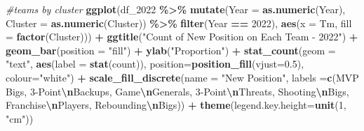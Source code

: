 \documentclass[
]{article}
\newenvironment{Shaded}{\begin{snugshade}}{\end{snugshade}}
\newcommand{\AttributeTok}[1]{\textcolor[rgb]{0.13,0.29,0.53}{#1}}
\newcommand{\CommentTok}[1]{\textcolor[rgb]{0.56,0.35,0.01}{\textit{#1}}}
\newcommand{\DecValTok}[1]{\textcolor[rgb]{0.00,0.00,0.81}{#1}}
\newcommand{\FloatTok}[1]{\textcolor[rgb]{0.00,0.00,0.81}{#1}}
\newcommand{\FunctionTok}[1]{\textcolor[rgb]{0.13,0.29,0.53}{\textbf{#1}}}
\newcommand{\NormalTok}[1]{#1}
\newcommand{\SpecialCharTok}[1]{\textcolor[rgb]{0.81,0.36,0.00}{\textbf{#1}}}
\newcommand{\StringTok}[1]{\textcolor[rgb]{0.31,0.60,0.02}{#1}}
\begin{document}
\begin{Shaded}
\begin{Highlighting}[]
\CommentTok{\#teams by cluster}
\FunctionTok{ggplot}\NormalTok{(df\_2022 }\SpecialCharTok{\%\textgreater{}\%} 
         \FunctionTok{mutate}\NormalTok{(}\AttributeTok{Year =} \FunctionTok{as.numeric}\NormalTok{(Year),}
                \AttributeTok{Cluster =} \FunctionTok{as.numeric}\NormalTok{(Cluster)) }\SpecialCharTok{\%\textgreater{}\%}
         \FunctionTok{filter}\NormalTok{(Year }\SpecialCharTok{==} \DecValTok{2022}\NormalTok{),}
       \FunctionTok{aes}\NormalTok{(}\AttributeTok{x =}\NormalTok{ Tm, }\AttributeTok{fill =} \FunctionTok{factor}\NormalTok{(Cluster))) }\SpecialCharTok{+}
  \FunctionTok{ggtitle}\NormalTok{(}\StringTok{"Count of New Position on Each Team {-} 2022"}\NormalTok{) }\SpecialCharTok{+}
  \FunctionTok{geom\_bar}\NormalTok{(}\AttributeTok{position =} \StringTok{"fill"}\NormalTok{) }\SpecialCharTok{+} \FunctionTok{ylab}\NormalTok{(}\StringTok{"Proportion"}\NormalTok{) }\SpecialCharTok{+}
  \FunctionTok{stat\_count}\NormalTok{(}\AttributeTok{geom =} \StringTok{"text"}\NormalTok{, }
             \FunctionTok{aes}\NormalTok{(}\AttributeTok{label =} \FunctionTok{stat}\NormalTok{(count)),}
             \AttributeTok{position=}\FunctionTok{position\_fill}\NormalTok{(}\AttributeTok{vjust=}\FloatTok{0.5}\NormalTok{), }\AttributeTok{colour=}\StringTok{"white"}\NormalTok{) }\SpecialCharTok{+}
    \FunctionTok{scale\_fill\_discrete}\NormalTok{(}\AttributeTok{name =} \StringTok{"New Position"}\NormalTok{, }\AttributeTok{labels =}\FunctionTok{c}\NormalTok{(}\StringTok{\textquotesingle{}MVP Bigs\textquotesingle{}}\NormalTok{, }\StringTok{\textquotesingle{}3{-}Point}\SpecialCharTok{\textbackslash{}n}\StringTok{Backups\textquotesingle{}}\NormalTok{, }\StringTok{\textquotesingle{}Game}\SpecialCharTok{\textbackslash{}n}\StringTok{Generals\textquotesingle{}}\NormalTok{, }\StringTok{\textquotesingle{}3{-}Point}\SpecialCharTok{\textbackslash{}n}\StringTok{Threats\textquotesingle{}}\NormalTok{, }\StringTok{\textquotesingle{}Shooting}\SpecialCharTok{\textbackslash{}n}\StringTok{Bigs\textquotesingle{}}\NormalTok{, }\StringTok{\textquotesingle{}Franchise}\SpecialCharTok{\textbackslash{}n}\StringTok{Players\textquotesingle{}}\NormalTok{, }\StringTok{\textquotesingle{}Rebounding}\SpecialCharTok{\textbackslash{}n}\StringTok{Bigs\textquotesingle{}}\NormalTok{)) }\SpecialCharTok{+}
  \FunctionTok{theme}\NormalTok{(}\AttributeTok{legend.key.height=}\FunctionTok{unit}\NormalTok{(}\DecValTok{1}\NormalTok{, }\StringTok{"cm"}\NormalTok{))}
\end{Highlighting}
\end{Shaded}
\end{document}
